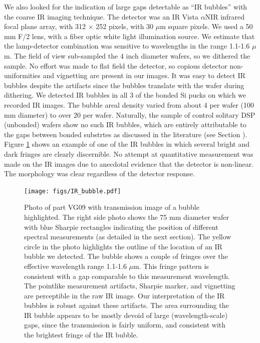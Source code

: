 \documentclass[osajnl,preprint,showpacs,superscriptaddress,12pt]{revtex4-1} %
\begin{document}
We also looked for the indication of large gaps detectable as ``IR bubbles'' \cite{1992JEMat..21..669M} with the coarse IR imaging technique.  The detector was an IR Vista $\alpha$NIR infrared focal plane array, with 312 $\times$ 252 pixels, with 30 $\mu$m square pixels.  We used a 50 mm F/2 lens, with a fiber optic white light illumination source.  We estimate that the lamp-detector combination was sensitive to wavelengths in the range 1.1-1.6 $\mu$m.  The field of view sub-sampled the 4 inch diameter wafers, so we dithered the sample.  No effort was made to flat field the detector, so copious detector non-uniformities and vignetting are present in our images.  It was easy to detect IR bubbles despite the artifacts since the bubbles translate with the wafer during dithering.  We detected IR bubbles in all 3 of the bonded Si pucks on which we recorded IR images.  The bubble areal density varied from about 4 per wafer (100 mm diameter) to over 20 per wafer.  Naturally, the sample of control solitary DSP (unbonded) wafers show no such IR bubbles, which are entirely attributable to the gaps between bonded substrtes as discussed in the literature (see Section \label{secHistory}).  Figure \ref{IRbubble} shows an example of one of the IR bubbles in which several bright and dark fringes are clearly discernible.  No attempt at quantitative measurement was made on the IR images due to anecdotal evidence that the detector is non-linear.  The morphology was clear regardless of the detector response.  

\begin{figure}[htbp]
\centerline{\texttt{[image: figs/IR\_bubble.pdf]}}
\caption{Photo of part VG09 with transmission image of a bubble highlighted\label{IRbubble}.  The right side photo shows the 75 mm diameter wafer with blue Sharpie rectangles indicating the position of different spectral measurements (as detailed in the next section).  The yellow circle in the photo highlights the outline of the location of an IR bubble we detected.  The bubble shows a couple of fringes over the effective wavelength range 1.1-1.6 $\mu$m.  This fringe pattern is consistent with a gap comparable to this measurement wavelength.  The pointlike measurement artifacts, Sharpie marker, and vignetting are perceptible in the raw IR image.  Our interpretation of the IR bubbles is robust against these artifacts.  The area surrounding the IR bubble appears to be mostly devoid of large (wavelength-scale) gaps, since the transmission is fairly uniform, and consistent with the brightest fringe of the IR bubble.  }
\end{figure}
\end{document}
